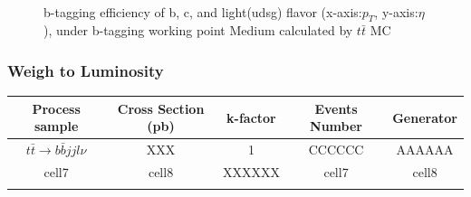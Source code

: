 			\begin{figure}[H]
			\centering
			    \\
			   \caption{b-tagging efficiency of b, c, and light(udsg) flavor (x-axis:$p_T$, y-axis:$\eta$), under b-tagging working point Medium calculated by $t\bar{t}$ MC}
			\label{DataMC:fig:tt_eff_btag}
			\end{figure}
			\FloatBarrier


		\subsubsection{Weigh to Luminosity}
		\label{sssec:DataAndMC_lumi}





\begin{center}
\begin{tabular}{ c c c c c }
\hline
Process sample & Cross Section (pb) & k-factor & Events Number & Generator \\ 
\hline
$t$$\bar{t}\rightarrow b \bar{b}jjl\nu$ & XXX & 1 & CCCCCC & AAAAAA \\
\hline
cell7 & cell8 & XXXXXX & cell7 & cell8 \\
\hline  {}
\end{tabular}
\end{center}


\FloatBarrier
